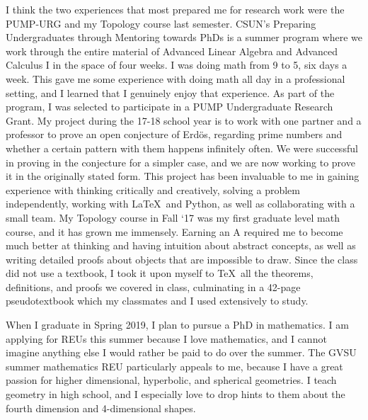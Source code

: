 \documentclass[letterpaper, 12pt]{article}
\theoremstyle{definition}%
\numberwithin{exercise}{section}
\theoremstyle{remark}%
\begin{document}
I think the two experiences that most prepared me for research work were the PUMP-URG and my Topology course last semester. CSUN’s Preparing Undergraduates through Mentoring towards PhDs is a summer program where we work through the entire material of Advanced Linear Algebra and Advanced Calculus I in the space of four weeks. I was doing math from 9 to 5, six days a week. This gave me some experience with doing math all day in a professional setting, and I learned that I genuinely enjoy that experience. As part of the program, I was selected to participate in a PUMP Undergraduate Research Grant. My project during the 17-18 school year is to work with one partner and a professor to prove an open conjecture of Erdös, regarding prime numbers and whether a certain pattern with them happens infinitely often. We were successful in proving in the conjecture for a simpler case, and we are now working to prove it in the originally stated form. This project has been invaluable to me in gaining experience with thinking critically and creatively, solving a problem independently, working with \LaTeX\ and Python, as well as collaborating with a small team. 
My Topology course in Fall ‘17 was my first graduate level math course, and it has grown me immensely. Earning an A required me to become much better at thinking and having intuition about abstract concepts, as well as writing detailed proofs about objects that are impossible to draw. Since the class did not use a textbook, I took it upon myself to \TeX\ all the theorems, definitions, and proofs we covered in class, culminating in a 42-page pseudotextbook which my classmates and I used extensively to study. 

When I graduate in Spring 2019, I plan to pursue a PhD in mathematics. I am applying for REUs this summer because I love mathematics, and I cannot imagine anything else I would rather be paid to do over the summer. The GVSU summer mathematics REU particularly appeals to me, because I have a great passion for higher dimensional, hyperbolic, and spherical geometries. I teach geometry in high school, and I especially love to drop hints to them about the fourth dimension and 4-dimensional shapes.
\pagebreak
\end{document}
